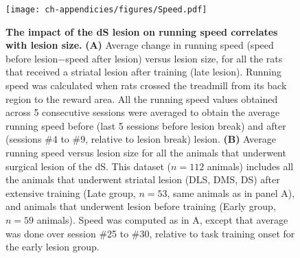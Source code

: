 \begin{figure}[!h]
  \begin{center}
    \texttt{[image: ch-appendicies/figures/Speed.pdf]}
    \caption[Speed-Lesion Size Correlation]
    {\textbf{The impact of the dS lesion on running speed correlates with lesion size.}
    \textbf{(A)} Average change in running speed (speed before lesion$-$speed after lesion) versus lesion size, for all the rats that received a striatal lesion after training (late lesion).
    Running speed was calculated when rats crossed the treadmill from its back region to the reward area.
    All the running speed values obtained across 5 consecutive sessions were averaged to obtain the average running speed before (last 5 sessions before lesion break) and after (sessions \#4 to \#9, relative to lesion break) lesion. 
    \textbf{(B)} Average running speed versus lesion size for all the animals that underwent surgical lesion of the dS.
    This dataset ($n=112$ animals) includes all the animals that underwent striatal lesion (DLS, DMS, DS) after extensive training (Late group, $n=53$, same animals as in panel A), and animals that underwent lesion before training (Early group, $n=59$ animals).
    Speed was computed as in A, except that average was done over session \#25 to \#30, relative to task training onset for the early lesion group.
    }
    \label{fig:appendix:spd}
  \end{center}
\end{figure}